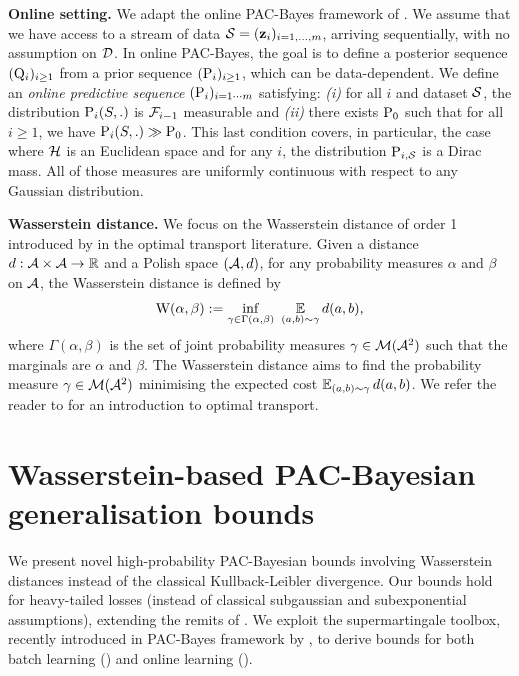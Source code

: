 \textbf{Online setting.} 
We adapt the online PAC-Bayes framework of \cite{haddouche2022online}.
We assume that we have access to a stream of data $\S=(\z_i)_{i=1,\dots,m}$, arriving sequentially, with no assumption on $\Dcal$.
In online PAC-Bayes, the goal is to define a posterior sequence $(\Q_i)_{i\geq 1}$ from a prior sequence $(\P_i)_{i\geq 1}$, which can be data-dependent.
We define an \emph{online predictive sequence} $(\P_i)_{i=1\cdots m}$ satisfying: {\it (i)} for all $i$ and dataset $\S$, the distribution $\P_i(S,.)$ is $\Fcal_{i-1}$ measurable and {\it (ii)} there exists $\P_0$ such that for all $i \geq 1$, we have $\P_i(S,.)\gg \P_{0}$. 
This last condition covers, in particular, the case where $\H$ is an Euclidean space and for any $i$, the distribution $\P_{i,\S}$ is a Dirac mass. 
All of those measures are uniformly continuous with respect to any Gaussian distribution. 

\textbf{Wasserstein distance.}
We focus on the Wasserstein distance of order 1 introduced by \cite{kantorovich1960mathematical} in the optimal transport literature. 
Given a distance $d: \Acal\times\Acal \to \Rbb$ and a Polish space $(\Acal, d)$, for any probability measures $\alpha$ and $\beta$ on $\Acal$, the Wasserstein distance is defined by
\begin{align}
\W(\alpha, \beta) \defeq \inf_{\gamma\in \Gamma(\alpha, \beta)}\
\EE_{(a, b)\sim\gamma}d(a, b),\label{eq:wasserstein}
\end{align}
where $\Gamma(\alpha, \beta)$ is the set of joint probability measures $\gamma \in \Mcal(\Acal^2)$ such that the marginals are $\alpha$ and $\beta$.
The Wasserstein distance aims to find the probability measure $\gamma\in\Mcal(\Acal^2)$ minimising the expected cost $\EE_{(a, b)\sim\gamma}d(a, b)$.
We refer the reader to \cite{villani2009optimal,peyre2019computational} for an introduction to optimal transport.

\section{Wasserstein-based PAC-Bayesian generalisation bounds}
\label{sec:wasserstein}

We present novel high-probability PAC-Bayesian bounds involving Wasserstein distances instead of the classical Kullback-Leibler divergence. 
Our bounds hold for heavy-tailed losses (instead of classical subgaussian and subexponential assumptions), extending the remits of \cite[Theorem 11]{amit2022integral}.
We exploit the supermartingale toolbox, recently introduced in PAC-Bayes framework by \cite{haddouche2023pac,chugg2023unified,jang2023tight}, to derive bounds for both batch learning () and online learning ().


